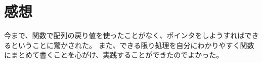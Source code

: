 

\section{感想}
今まで、関数で配列の戻り値を使ったことがなく、ポインタをしようすればできるということに驚かされた。
また、できる限り処理を自分にわかりやすく関数にまとめて書くことを心がけ、実践することができたのでよかった。

